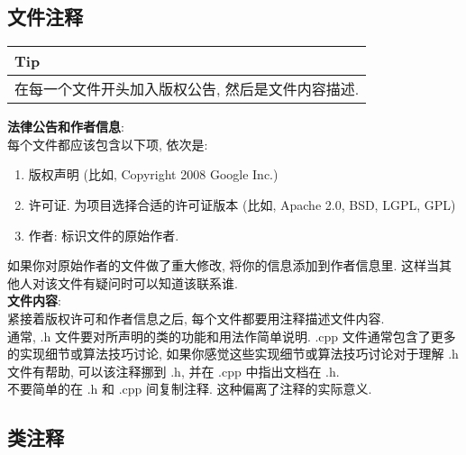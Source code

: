 \documentclass[a4paper,11pt,CJK]{article}
\begin{document}
\begin{CJK}{UTF8}{gbsn}
\subsection{文件注释}
\begin{table}[htbp]
\flushleft
\begin{tabular}{p{400pt}}
\toprule
\rowcolor[gray]{.8} Tip \\
\midrule
在每一个文件开头加入版权公告, 然后是文件内容描述.
\\
\bottomrule
\end{tabular}
\end{table}
\noindent
\textbf{法律公告和作者信息}:\\
\indent 每个文件都应该包含以下项, 依次是:
\begin{enumerate}
\item[\labelitemi]
版权声明 (比如, Copyright 2008 Google Inc.)
\item[\labelitemi]
许可证. 为项目选择合适的许可证版本 (比如, Apache 2.0, BSD, LGPL, GPL)
\item[\labelitemi]
作者: 标识文件的原始作者.
\end{enumerate}
\indent 如果你对原始作者的文件做了重大修改, 将你的信息添加到作者信息里. 这样当其他人对该文件有疑问时可以知道该联系谁.\\
\textbf{文件内容}:\\
\indent 紧接着版权许可和作者信息之后, 每个文件都要用注释描述文件内容.\\
\indent 通常, .h 文件要对所声明的类的功能和用法作简单说明. .cpp 文件通常包含了更多的实现细节或算法技巧讨论, 如果你感觉这些实现细节或算法技巧讨论对于理解 .h 文件有帮助, 可以该注释挪到 .h, 并在 .cpp 中指出文档在 .h.\\
\indent 不要简单的在 .h 和 .cpp 间复制注释. 这种偏离了注释的实际意义.

\subsection{类注释}


\end{CJK}
\end{document}
